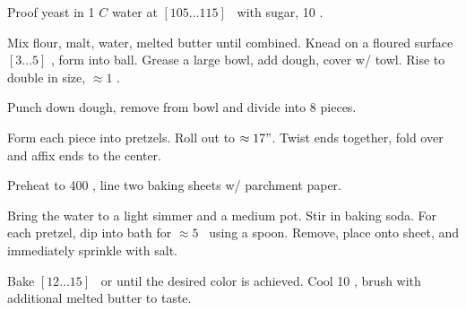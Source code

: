 \begin{preparation}
\item Proof yeast in 1 $C$ water at $[105 \dots 115]$ \Fahrenheit~with sugar, 10 \minute.

\item Mix flour, malt, water, melted butter until combined.
	Knead on a floured surface $[3 \dots 5]$ \minute, form into ball.
	Grease a large bowl, add dough, cover w/ towl.
	Rise to double in size, $\approx 1$ \hour.

\item Punch down dough, remove from bowl and divide into 8 pieces.

\item Form each piece into pretzels.
	Roll out to $\approx 17"$.
	Twist ends together, fold over and affix ends to the center.

\item Preheat to 400 \Fahrenheit, line two baking sheets w/ parchment paper.

\item Bring the water to a light simmer and a medium pot.
	Stir in baking soda.
	For each pretzel, dip into bath for $\approx 5$ \second~using a spoon.
	Remove, place onto sheet, and immediately sprinkle with salt.

\item Bake $[12 \dots 15]$ \minute~or until the desired color is achieved.
	Cool 10 \minute, brush with additional melted butter to taste.
\end{preparation}

\recipeend
